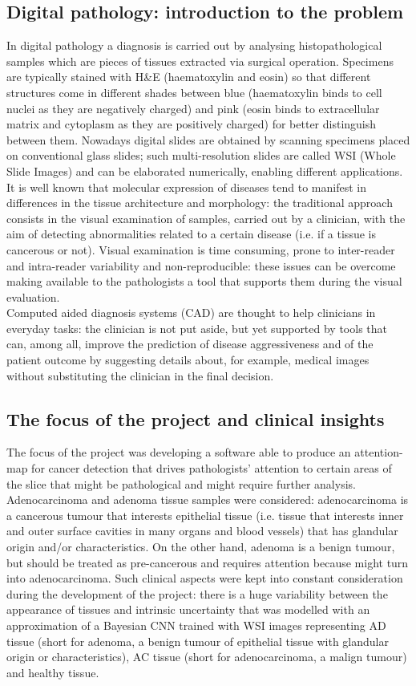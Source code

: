 \documentclass[12pt]{article}
\begin{document}
\subsection{Digital pathology: introduction to the problem}
In digital pathology a diagnosis is carried out by analysing histopathological samples which are pieces of tissues extracted via surgical operation. Specimens are typically stained with H\&E (haematoxylin and eosin) so that different structures come in different shades between blue (haematoxylin binds to cell nuclei as they are negatively charged) and pink (eosin binds to extracellular matrix and cytoplasm as they are positively charged) for better distinguish between them. Nowadays digital slides are obtained by scanning specimens placed on conventional glass slides; such multi-resolution slides are called WSI (Whole Slide Images) and can be elaborated numerically, enabling different applications.\\
It is well known that molecular expression of diseases tend to manifest in differences in the tissue architecture and morphology: the traditional approach consists in the visual examination of samples, carried out by a clinician, with the aim of detecting abnormalities related to a certain disease (i.e. if a tissue is cancerous or not). Visual examination is time consuming, prone to inter-reader and intra-reader variability and non-reproducible: these issues can be overcome making available to the pathologists a tool that supports them during the visual evaluation.\\
Computed aided diagnosis systems (CAD) are thought to help clinicians in everyday tasks: the clinician is not put aside, but yet supported by tools that can, among all, improve the prediction of disease aggressiveness and of the patient outcome by suggesting details about, for example, medical images without substituting the clinician in the final decision.
\subsection{The focus of the project and clinical insights}
The focus of the project was developing a software able to produce an attention-map for cancer detection that drives pathologists’ attention to certain areas of the slice that might be pathological and might require further analysis.\\
Adenocarcinoma and adenoma tissue samples were considered: adenocarcinoma is a cancerous tumour that interests epithelial tissue (i.e. tissue that interests inner and outer surface cavities in many organs and blood vessels) that has glandular origin and/or characteristics. On the other hand, adenoma is a benign tumour, but should be treated as pre-cancerous and requires attention because might turn into adenocarcinoma.
Such clinical aspects were kept into constant consideration during the development of the project: there is a huge variability between the appearance of tissues and intrinsic uncertainty that was modelled with an approximation of a Bayesian CNN trained with WSI images representing AD tissue (short for adenoma, a benign tumour of epithelial tissue with glandular origin or characteristics), AC tissue (short for adenocarcinoma, a malign tumour) and healthy tissue.
\\
\end{document}

